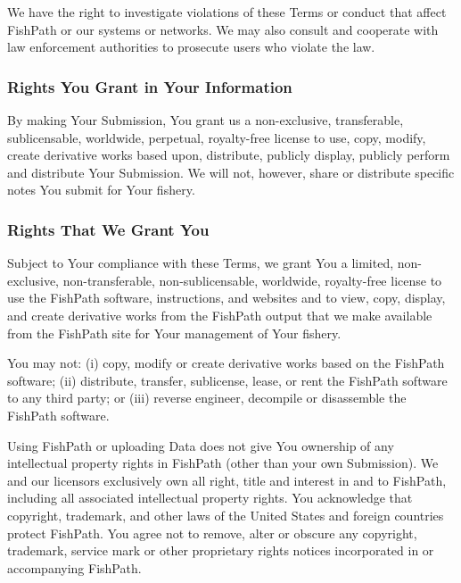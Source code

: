 \documentclass[
  11pt,
]{book}
\begin{document}
We have the right to investigate violations of these Terms or conduct that affect FishPath or our systems or networks. We may also consult and cooperate with law enforcement authorities to prosecute users who violate the law.

\hypertarget{rights-you-grant-in-your-information}{%
\subsubsection*{Rights You Grant in Your Information}\label{rights-you-grant-in-your-information}}

By making Your Submission, You grant us a non-exclusive, transferable, sublicensable, worldwide, perpetual, royalty-free license to use, copy, modify, create derivative works based upon, distribute, publicly display, publicly perform and distribute Your Submission. We will not, however, share or distribute specific notes You submit for Your fishery.

\hypertarget{rights-that-we-grant-you}{%
\subsubsection*{Rights That We Grant You}\label{rights-that-we-grant-you}}

Subject to Your compliance with these Terms, we grant You a limited, non-exclusive, non-transferable, non-sublicensable, worldwide, royalty-free license to use the FishPath software, instructions, and websites and to view, copy, display, and create derivative works from the FishPath output that we make available from the FishPath site for Your management of Your fishery.

You may not: (i) copy, modify or create derivative works based on the FishPath software; (ii) distribute, transfer, sublicense, lease, or rent the FishPath software to any third party; or (iii) reverse engineer, decompile or disassemble the FishPath software.

Using FishPath or uploading Data does not give You ownership of any intellectual property rights in FishPath (other than your own Submission). We and our licensors exclusively own all right, title and interest in and to FishPath, including all associated intellectual property rights. You acknowledge that copyright, trademark, and other laws of the United States and foreign countries protect FishPath. You agree not to remove, alter or obscure any copyright, trademark, service mark or other proprietary rights notices incorporated in or accompanying FishPath.
\end{document}
